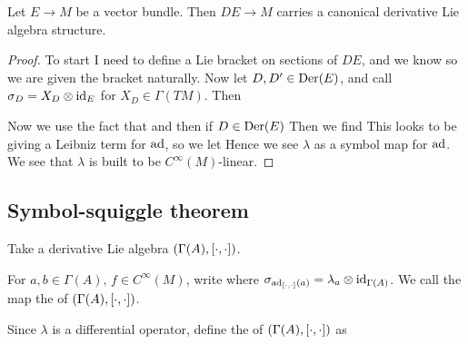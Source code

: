 \documentclass{article}
\begin{document}
\begin{prop}
Let $E \to M$ be a vector bundle. Then $DE \to M$ carries a canonical derivative Lie algebra structure. 
\end{prop}
\begin{proof}
To start I need to define a Lie bracket on sections of $DE$, and we know 
so we are given the bracket naturally. Now let $D,D^\prime \in \operatorname{Der}(E)$, and call $\sigma_D = X_D \otimes \operatorname{id}_E$ for $X_D \in \Gamma(TM)$. Then 

Now we use the fact that 
and then if $D \in \operatorname{Der}(E)$
Then we find 
This looks to be giving a Leibniz term for $\operatorname{ad}$, so we let 
Hence we see $\lambda$ as a symbol map for $\operatorname{ad}$. We see that $\lambda$ is built to be $C^\infty(M)$-linear. 
\end{proof}

\subsection{Symbol-squiggle theorem}
Take a derivative Lie algebra $(\Gamma(A), \left[ \cdot, \cdot \right])$. 

\begin{definition}
For $a,b \in \Gamma(A), \, f \in C^\infty(M)$, write 
where $\sigma_{\operatorname{ad}_{\left[ \cdot, \cdot \right]}(a)} = \lambda_a \otimes \operatorname{id}_{\Gamma(A)}$. We call the map
the  of $(\Gamma(A), \left[ \cdot, \cdot \right])$. 
\end{definition}

\begin{definition}
Since $\lambda$ is a differential operator, define the  of $(\Gamma(A), \left[ \cdot, \cdot \right])$ as 
\end{definition}
\end{document}
